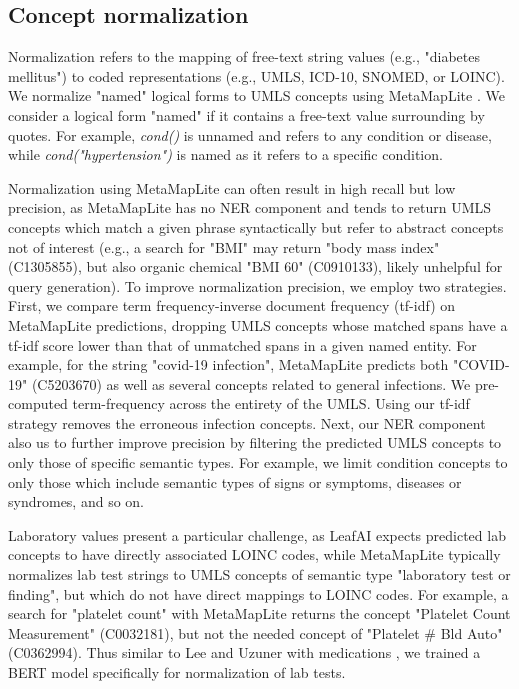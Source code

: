 \documentclass[../main.tex]{subfiles}
\begin{document}
\subsection*{Concept normalization}

Normalization refers to the mapping of free-text string values (e.g., "diabetes mellitus") to coded representations (e.g., UMLS, ICD-10, SNOMED, or LOINC). We normalize "named" logical forms to UMLS concepts using MetaMapLite \cite{aronson2001effective, demner2017metamap}. We consider a logical form "named" if it contains a free-text value surrounding by quotes. For example, \textit{cond()} is unnamed and refers to any condition or disease, while \textit{cond("hypertension")} is named as it refers to a specific condition. 

Normalization using MetaMapLite can often result in high recall but low precision, as MetaMapLite has no NER component and tends to return UMLS concepts which match a given phrase syntactically but refer to abstract concepts not of interest (e.g., a search for "BMI" may return "body mass index" (C1305855), but also organic chemical "BMI 60" (C0910133), likely unhelpful for query generation). To improve normalization precision, we employ two strategies. First, we compare term frequency-inverse document frequency (tf-idf) on MetaMapLite predictions, dropping UMLS concepts whose matched spans have a tf-idf score lower than that of unmatched spans in a given named entity. For example, for the string "covid-19 infection", MetaMapLite predicts both "COVID-19" (C5203670) as well as several concepts related to general infections. We pre-computed term-frequency across the entirety of the UMLS. Using our tf-idf strategy removes the erroneous infection concepts. Next, our NER component also us to further improve precision by filtering the predicted UMLS concepts to only those of specific semantic types. For example, we limit condition concepts to only those which include semantic types of signs or symptoms, diseases or syndromes, and so on.

Laboratory values present a particular challenge, as LeafAI expects predicted lab concepts to have directly associated LOINC codes, while MetaMapLite typically normalizes lab test strings to UMLS concepts of semantic type "laboratory test or finding", but which do not have direct mappings to LOINC codes. For example, a search for "platelet count" with MetaMapLite returns the concept "Platelet Count Measurement" (C0032181), but not the needed concept of "Platelet \# Bld Auto" (C0362994). Thus similar to Lee and Uzuner with medications \cite{lee2020normalizing}, we trained a BERT model specifically for normalization of lab tests.
\end{document}
